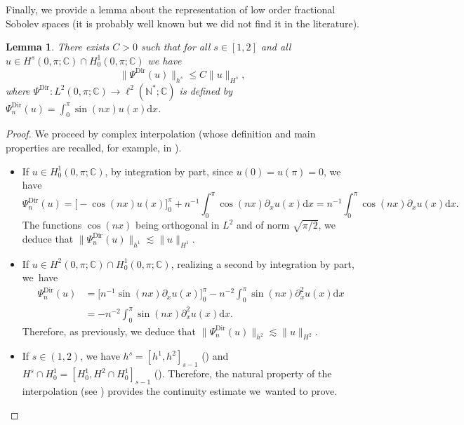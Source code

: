 \documentclass[JEP,XML,SOM,Unicode,NoEqCountersInSection,published]{cedram}
\newtheorem{lemma}[theorem]{Lemma}
\theoremstyle{definition}
\begin{document}
Finally, we provide a lemma about the representation of low order fractional Sobolev spaces (it is probably well known but we did not find it in the literature).
\begin{lemma}
\label{lem_interpol}
There exists $C>0$ such that for all $s\in [1,2]$ and all $u\in H^s(0,\pi;\mathbb{C}) \cap H^1_0(0,\pi;\mathbb{C})$ we have
\[
\big\| \Psi^{\mathrm{Dir}}(u) \big\|_{h^s} \leq C \| u\|_{H^s},
\]
where $\Psi^{\mathrm{Dir}}: L^2(0,\pi;\mathbb{C}) \to \ell^2(\mathbb{N}^*;\mathbb{C})$ is defined by $\Psi^{\mathrm{Dir}}_n(u) = \int_0^\pi \sin(nx) u(x) \mathrm{d}x$.
\end{lemma}
\begin{proof} We proceed by complex interpolation (whose definition and main properties are recalled, for example, in \cite{Tri78,Agra15}).
\begin{itemize}
\item
If $u\in H^1_0(0,\pi;\mathbb{C})$, by integration by part, since $u(0)=u(\pi)=0$, we have
\[
\Psi^{\mathrm{Dir}}_n(u) = \big[-\cos(nx) u(x) \big]_0^\pi + n^{-1} \int_0^\pi \cos(nx) \partial_x u(x) \mathrm{d}x = n^{-1} \int_0^\pi \cos(nx) \partial_x u(x) \mathrm{d}x.
\]
The functions $\cos(nx)$ being orthogonal in $L^2$ and of norm $\sqrt{\pi/2}$, we deduce that $\| \Psi^{\mathrm{Dir}}_n(u) \|_{h^1} \lesssim \|u\|_{H^1}$.

\item
If $u\in H^2(0,\pi;\mathbb{C}) \cap H^1_0(0,\pi;\mathbb{C})$, realizing a second by integration by part, we~have
\begin{equation*}
\begin{split}
\Psi^{\mathrm{Dir}}_n(u) &= \big[n^{-1} \sin(nx) \partial_x u(x) \big]_0^\pi - n^{-2} \int_0^\pi \sin(nx) \partial_x^2 u(x) \mathrm{d}x \\
&= - n^{-2} \int_0^\pi \sin(nx) \partial_x^2 u(x) \mathrm{d}x.
\end{split}
\end{equation*}
Therefore, as previously, we deduce that $\| \Psi^{\mathrm{Dir}}_n(u) \|_{h^2} \lesssim \|u\|_{H^2}$.

\item
If $s\in (1,2)$, we have $h^s = [h^1,h^2]_{s-1}$ (\cite[Th.\ p.\,130]{Tri78}) and $H^s \cap H^1_0 = [H^1_0,H^2\cap H^1_0]_{s-1}$ (\cite[Th.\,13.2.2 p.\,198]{Agra15}). Therefore, the natural property of the interpolation (see \eg \cite[Th.\,13.2.1 p.\,197]{Agra15}) provides the continuity estimate we~wanted to prove.\qedhere
\end{itemize}
\end{proof}

\backmatter


\end{document}
